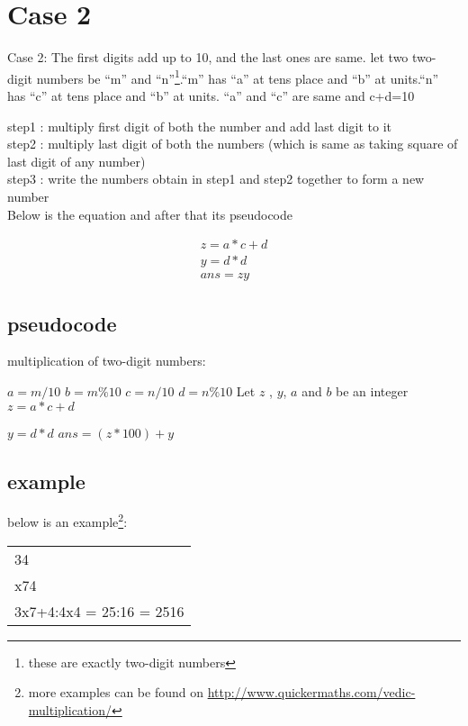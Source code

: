 \documentclass{article}
\begin{document}
\newpage
\section{Case 2}
\noindent Case  2: The first digits add up to 10, and the last ones are same.
let two two-digit numbers be ``m'' and ``n''\footnote{these are exactly two-digit numbers}.``m'' has ``a'' at tens place and ``b'' at units.``n'' has ``c'' at tens place and ``b'' at units. ``a'' and ``c'' are same and c+d=10\cite{Swami}

\noindent step1 : multiply first digit of both the number and add last digit to it \\
step2 : multiply last digit of both the numbers (which is same as taking square of last digit of any number)\\
step3 : write the numbers obtain in step1 and step2 together to form a new number\\

\noindent Below is the equation and after that its pseudocode

\begin{align*}
	z=a*c+d \\
	y=d*d \\
	ans=zy
	\end{align*}
\subsection{pseudocode}
  \begin{algorithm}
   \caption{multiplication of two-digit numbers: }
    \begin{algorithmic}[1]
\State $a=m/10$
\State $b=m\%10$
\State $c=n/10$
\State $d=n\%10$
	\State Let $z$ , $y$, $a$ and $b$ be an integer
	\State $z=a*c+d$
	
	\State$y=d*d$
	\State$ans=(z*100)+y$
	
	\EndIf
	\EndFunction
\end{algorithmic}
\end{algorithm}
\subsection{example}
\noindent below is an example\footnote{more examples can be found on \url{http://www.quickermaths.com/vedic-multiplication/}}:
\newline
\begin{tabular}{l} 

34\\

x74\\

3x7+4:4x4 = 25:16 = 2516\\
\end{tabular}
\newpage
\end{document}
